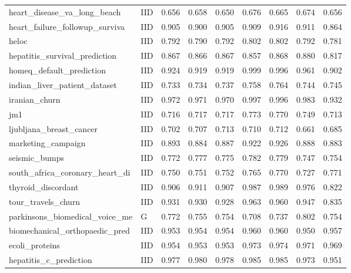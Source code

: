 \begin{longtable}{@{}p{3.95cm}lrrrrrrr@{}}
heart\_\allowbreak{}disease\_\allowbreak{}va\_\allowbreak{}long\_\allowbreak{}beach & IID & 0.656 & 0.658 & 0.650 & 0.676 & 0.665 & 0.674 & 0.656\\
heart\_\allowbreak{}failure\_\allowbreak{}followup\_\allowbreak{}surviva & IID & 0.905 & 0.900 & 0.905 & 0.909 & 0.916 & 0.911 & 0.864\\
heloc & IID & 0.792 & 0.790 & 0.792 & 0.802 & 0.802 & 0.792 & 0.781\\
hepatitis\_\allowbreak{}survival\_\allowbreak{}prediction & IID & 0.867 & 0.866 & 0.867 & 0.857 & 0.868 & 0.880 & 0.817\\
homeq\_\allowbreak{}default\_\allowbreak{}prediction & IID & 0.924 & 0.919 & 0.919 & 0.999 & 0.996 & 0.961 & 0.902\\
indian\_\allowbreak{}liver\_\allowbreak{}patient\_\allowbreak{}dataset & IID & 0.733 & 0.734 & 0.737 & 0.758 & 0.764 & 0.744 & 0.745\\
iranian\_\allowbreak{}churn & IID & 0.972 & 0.971 & 0.970 & 0.997 & 0.996 & 0.983 & 0.932\\
jm1 & IID & 0.716 & 0.717 & 0.717 & 0.773 & 0.770 & 0.749 & 0.713\\
ljubljana\_\allowbreak{}breast\_\allowbreak{}cancer & IID & 0.702 & 0.707 & 0.713 & 0.710 & 0.712 & 0.661 & 0.685\\
marketing\_\allowbreak{}campaign & IID & 0.893 & 0.884 & 0.887 & 0.922 & 0.926 & 0.888 & 0.883\\
seismic\_\allowbreak{}bumps & IID & 0.772 & 0.777 & 0.775 & 0.782 & 0.779 & 0.747 & 0.754\\
south\_\allowbreak{}africa\_\allowbreak{}coronary\_\allowbreak{}heart\_\allowbreak{}di & IID & 0.750 & 0.751 & 0.752 & 0.765 & 0.770 & 0.727 & 0.771\\
thyroid\_\allowbreak{}discordant & IID & 0.906 & 0.911 & 0.907 & 0.987 & 0.989 & 0.976 & 0.822\\
tour\_\allowbreak{}travels\_\allowbreak{}churn & IID & 0.931 & 0.930 & 0.928 & 0.963 & 0.960 & 0.947 & 0.835\\
parkinsons\_\allowbreak{}biomedical\_\allowbreak{}voice\_\allowbreak{}me & G & 0.772 & 0.755 & 0.754 & 0.708 & 0.737 & 0.802 & 0.754\\
\midrule
biomechanical\_\allowbreak{}orthopaedic\_\allowbreak{}pred & IID & 0.953 & 0.954 & 0.954 & 0.960 & 0.960 & 0.950 & 0.957\\
ecoli\_\allowbreak{}proteins & IID & 0.954 & 0.953 & 0.953 & 0.973 & 0.974 & 0.971 & 0.969\\
hepatitis\_\allowbreak{}c\_\allowbreak{}prediction & IID & 0.977 & 0.980 & 0.978 & 0.985 & 0.985 & 0.973 & 0.951\\

\end{longtable}
